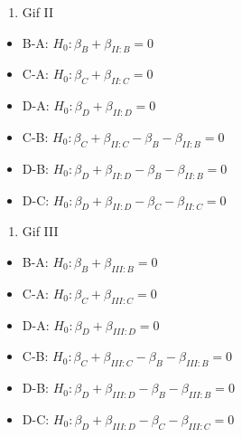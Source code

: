 \documentclass[
  12pt,dutch]{book}
\providecommand{\tightlist}{%
  \setlength{\itemsep}{0pt}\setlength{\parskip}{0pt}}
\theoremstyle{definition}
\theoremstyle{definition}
\theoremstyle{definition}
\theoremstyle{definition}
\theoremstyle{remark}
\begin{document}
\begin{enumerate}
\def\labelenumi{\arabic{enumi}.}
\setcounter{enumi}{1}
\tightlist
\item
  Gif II
\end{enumerate}

\begin{itemize}
\tightlist
\item
  B-A: \(H_0: \beta_{B}+\beta_{II:B}=0\)
\item
  C-A: \(H_0: \beta_{C}+\beta_{II:C}=0\)
\item
  D-A: \(H_0: \beta_{D}+\beta_{II:D}=0\)
\item
  C-B: \(H_0: \beta_{C}+\beta_{II:C}-\beta_{B}-\beta_{II:B}=0\)
\item
  D-B: \(H_0: \beta_{D}+\beta_{II:D}-\beta_{B}-\beta_{II:B}=0\)
\item
  D-C: \(H_0: \beta_{D}+\beta_{II:D}-\beta_{C}-\beta_{II:C}=0\)
\end{itemize}

\begin{enumerate}
\def\labelenumi{\arabic{enumi}.}
\setcounter{enumi}{2}
\tightlist
\item
  Gif III
\end{enumerate}

\begin{itemize}
\tightlist
\item
  B-A: \(H_0: \beta_{B}+\beta_{III:B}=0\)
\item
  C-A: \(H_0: \beta_{C}+\beta_{III:C}=0\)
\item
  D-A: \(H_0: \beta_{D}+\beta_{III:D}=0\)
\item
  C-B: \(H_0: \beta_{C}+\beta_{III:C}-\beta_{B}-\beta_{III:B}=0\)
\item
  D-B: \(H_0: \beta_{D}+\beta_{III:D}-\beta_{B}-\beta_{III:B}=0\)
\item
  D-C: \(H_0: \beta_{D}+\beta_{III:D}-\beta_{C}-\beta_{III:C}=0\)
\end{itemize}
\end{document}
